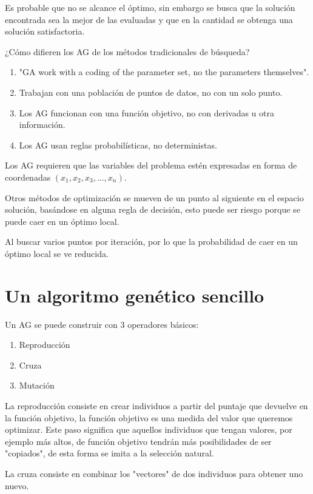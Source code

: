 Es probable que no se alcance el óptimo, sin embargo se busca que la solución
encontrada sea la mejor de las evaluadas y que en la cantidad se obtenga una
solución satisfactoria.


¿Cómo difieren los AG de los métodos tradicionales de búsqueda?
%
\begin{enumerate}
    \item "GA work with a coding of the parameter set, no the parameters
        themselves".
    \item Trabajan con una población de puntos de datos, no con un solo punto.
    \item Los AG funcionan con una función objetivo, no con derivadas u otra
        información.
    \item Los AG usan reglas probabilísticas, no deterministas.
\end{enumerate}

Los AG requieren que las variables del problema estén expresadas en forma de
coordenadas $(x_1, x_2, x_3, ..., x_n)$.

Otros métodos de optimización se mueven de un punto al siguiente en el espacio
solución, basándose en alguna regla de decisión, esto puede ser riesgo porque
se puede caer en un óptimo local.

Al buscar varios puntos por iteración, por lo que la probabilidad de caer en 
un óptimo local se ve reducida.


\section{Un algoritmo genético sencillo}
%
Un AG se puede construir con 3 operadores básicos:
\begin{enumerate}
    \item Reproducción
    \item Cruza
    \item Mutación
\end{enumerate}

La reproducción consiste en crear individuos a partir del puntaje que devuelve
en la función objetivo, la función objetivo es una medida del valor que
queremos optimizar.
%
Este paso significa que aquellos individuos que tengan valores, por ejemplo más
altos, de función objetivo tendrán más posibilidades de ser "copiados", de esta
forma se imita a la selección natural.

La cruza consiste en combinar los "vectores" de dos individuos para obtener uno
nuevo.

